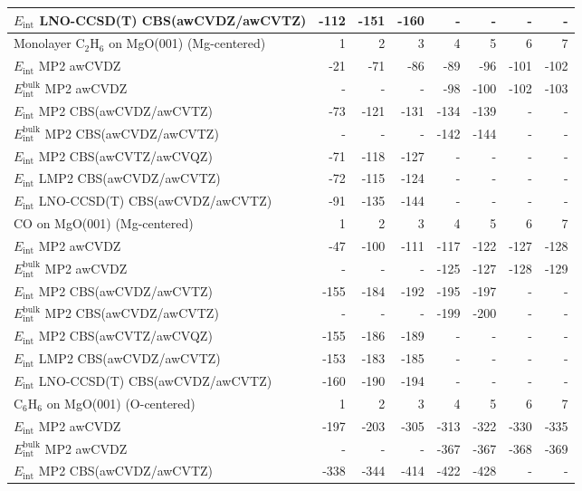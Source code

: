 \begin{longtable}{lrrrrrrr}
$E_\textrm{int}$ LNO-CCSD(T) CBS(awCVDZ/awCVTZ) & -112 & -151 & -160 & - & - & - & - \\
\toprule
Monolayer C$_2$H$_6$ on MgO(001) (Mg-centered) & 1 & 2 & 3 & 4 & 5 & 6 & 7 \\ 
\midrule
$E_\textrm{int}$ MP2 awCVDZ & -21 & -71 & -86 & -89 & -96 & -101 & -102 \\
$E_\textrm{int}^\textrm{bulk}$ MP2 awCVDZ & - & - & - & -98 & -100 & -102 & -103 \\
$E_\textrm{int}$ MP2 CBS(awCVDZ/awCVTZ) & -73 & -121 & -131 & -134 & -139 & - & - \\
$E_\textrm{int}^\textrm{bulk}$ MP2 CBS(awCVDZ/awCVTZ) & - & - & - & -142 & -144 & - & - \\
$E_\textrm{int}$ MP2 CBS(awCVTZ/awCVQZ) & -71 & -118 & -127 & - & - & - & - \\
$E_\textrm{int}$ LMP2 CBS(awCVDZ/awCVTZ) & -72 & -115 & -124 & - & - & - & - \\
$E_\textrm{int}$ LNO-CCSD(T) CBS(awCVDZ/awCVTZ) & -91 & -135 & -144 & - & - & - & - \\
\toprule
CO on MgO(001) (Mg-centered) & 1 & 2 & 3 & 4 & 5 & 6 & 7 \\ 
\midrule
$E_\textrm{int}$ MP2 awCVDZ & -47 & -100 & -111 & -117 & -122 & -127 & -128 \\
$E_\textrm{int}^\textrm{bulk}$ MP2 awCVDZ & - & - & - & -125 & -127 & -128 & -129 \\
$E_\textrm{int}$ MP2 CBS(awCVDZ/awCVTZ) & -155 & -184 & -192 & -195 & -197 & - & - \\
$E_\textrm{int}^\textrm{bulk}$ MP2 CBS(awCVDZ/awCVTZ) & - & - & - & -199 & -200 & - & - \\
$E_\textrm{int}$ MP2 CBS(awCVTZ/awCVQZ) & -155 & -186 & -189 & - & - & - & - \\
$E_\textrm{int}$ LMP2 CBS(awCVDZ/awCVTZ) & -153 & -183 & -185 & - & - & - & - \\
$E_\textrm{int}$ LNO-CCSD(T) CBS(awCVDZ/awCVTZ) & -160 & -190 & -194 & - & - & - & - \\
\toprule
C$_6$H$_6$ on MgO(001) (O-centered) & 1 & 2 & 3 & 4 & 5 & 6 & 7 \\ 
\midrule
$E_\textrm{int}$ MP2 awCVDZ & -197 & -203 & -305 & -313 & -322 & -330 & -335 \\
$E_\textrm{int}^\textrm{bulk}$ MP2 awCVDZ & - & - & - & -367 & -367 & -368 & -369 \\
$E_\textrm{int}$ MP2 CBS(awCVDZ/awCVTZ) & -338 & -344 & -414 & -422 & -428 & - & - \\

\end{longtable}
